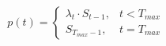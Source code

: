 \documentclass[preview]{standalone}
\begin{document}
\begin{align*}
p(t) = \begin{cases} \lambda_t \cdot S_{t-1}, & t < T_{max} \\ S_{T_{max}-1}, & t = T_{max} \end{cases}
\end{align*}
\end{document}
